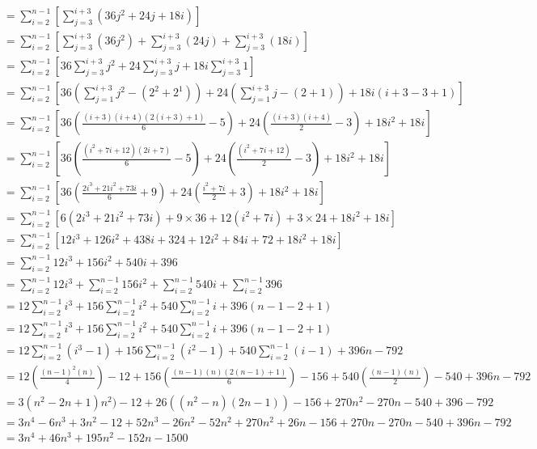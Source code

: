 \documentclass[11pt]{article}
\begin{document}
\begin{enumerate}[label=\alph*)]
     \begin{align*}
        &=\sum_{i=2}^{n-1} \left[ \sum_{j=3}^{i+3}\left( 36j^2+24j+18i \right) \right]\\
        &=\sum_{i=2}^{n-1} \left[ \sum_{j=3}^{i+3}\left( 36j^2 \right) +\sum_{j=3}^{i+3}\left( 24j \right) +\sum_{j=3}^{i+3}\left( 18i \right) \right]\\
        &=\sum_{i=2}^{n-1} \left[ 36\sum_{j=3}^{i+3}j^2 + 24\sum_{j=3}^{i+3}j + 18i\sum_{j=3}^{i+3} 1 \right]\\
        &=\sum_{i=2}^{n-1} \left[ 36\left(\sum_{j=1}^{i+3}j^2 -(2^{2}+2^{1})\right)+ 24\left(\sum_{j=1}^{i+3}j - (2+1)\right) + 18i(i+3-3+1) \right]\\
        &=\sum_{i=2}^{n-1} \left[ 36\left(\frac{(i+3)(i+4)(2(i+3)+1)}{6} -5\right)+ 24\left(\frac{(i+3)(i+4)}{2} - 3\right) + 18i^{2} +18i \right]\\
        &=\sum_{i=2}^{n-1} \left[ 36\left(\frac{(i^{2}+7i+12)(2i+7)}{6} -5\right)+ 24\left(\frac{(i^{2}+7i+12)}{2} - 3\right) + 18i^{2} +18i \right]\\
        &=\sum_{i=2}^{n-1} \left[ 36\left(\frac{2i^{3}+21i^{2}+73i}{6} + 9\right)+ 24\left(\frac{i^{2}+7i}{2} + 3\right) + 18i^{2} +18i \right]\\
        &=\sum_{i=2}^{n-1} \left[ 6\left(2i^{3}+21i^{2}+73i \right)+ 9\times 36 + 12\left(i^{2}+7i \right)+ 3\times 24 + 18i^{2} +18i \right]\\
        &=\sum_{i=2}^{n-1} \left[ 12i^{3}+126i^{2}+438i+ 324 + 12i^{2}+84i+72+18i^{2} +18i \right]\\
        &=\sum_{i=2}^{n-1}12i^{3}+156i^{2}+540i+ 396\\   
        &=\sum_{i=2}^{n-1}12i^{3}+\sum_{i=2}^{n-1}156i^{2}+\sum_{i=2}^{n-1}540i+ \sum_{i=2}^{n-1}396\\  
        &=12\sum_{i=2}^{n-1}i^{3}+156\sum_{i=2}^{n-1}i^{2}+540\sum_{i=2}^{n-1}i+ 396(n-1-2+1)\\ 
        &=12\sum_{i=2}^{n-1}i^{3}+156\sum_{i=2}^{n-1}i^{2}+540\sum_{i=2}^{n-1}i+ 396(n-1-2+1)\\ 
        &=12\sum_{i=2}^{n-1}(i^{3}-1)+156\sum_{i=2}^{n-1}(i^{2}-1)+540\sum_{i=2}^{n-1}(i-1)+ 396n-792\\
        &=12\left(\frac{(n-1)^{2}(n)}{4}\right)-12+156\left(\frac{(n-1)(n)(2(n-1)+1)}{6}\right)-156+540\left(\frac{(n-1)(n)}{2}\right)-540+396n-792\\
        &=3(n^{2}-2n+1)n^{2})-12+26((n^{2}-n)(2n-1))-156+270n^{2}-270n-540+396-792\\
        &=3n^{4}-6n^{3}+3n^{2}-12+52n^{3}-26n^{2}-52n^{2}+270n^{2}+26n-156+270n-270n-540+396n-792\\
        &=3n^{4}+46n^{3}+195n^{2}-152n-1500
     \end{align*}
     

\end{enumerate}
\end{document}
